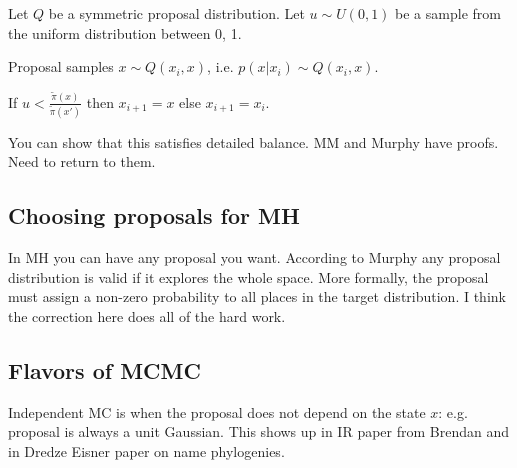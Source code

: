 \documentclass[12pt]{amsart}
\begin{document}
Let $Q$ be a symmetric proposal distribution. Let $u \sim U(0,1)$ be a sample from the uniform distribution between 0, 1.

Proposal samples $x \sim Q(x_i, x)$, i.e. $p(x | x_i) \sim Q(x_i, x)$. 

If $u < \frac{\widetilde{\pi}(x)}{\widetilde{\pi}(x')}$ then $x_{i+1} = x$ else $x_{i+ 1} = x_i$.

You can show that this satisfies detailed balance. MM and Murphy have proofs. Need to return to them.

\subsection{Choosing proposals for MH}
In MH you can have any proposal you want. According to Murphy any proposal distribution is valid if it explores the whole space. More formally, the proposal must assign a non-zero probability to all places in the target distribution. I think the correction here does all of the hard work.

\subsection{Flavors of MCMC}
Independent MC is when the proposal does not depend on the state $x$: e.g. proposal is always a unit Gaussian. This shows up in IR paper from Brendan and in Dredze Eisner paper on name phylogenies. 
\end{document}
